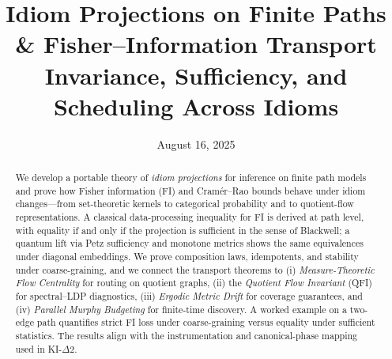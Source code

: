 \documentclass[11pt]{article}
\title{Idiom Projections on Finite Paths \& Fisher--Information Transport\\
\large Invariance, Sufficiency, and Scheduling Across Idioms}
\author{}
\date{August 16, 2025}
\theoremstyle{plain}
\theoremstyle{definition}
\theoremstyle{remark}
\newcommand{\1}{\mathbbm{1}}
\begin{document}
\maketitle

\begin{abstract}
We develop a portable theory of \emph{idiom projections} for inference on finite path models and prove how Fisher information (FI) and Cram{\'e}r--Rao bounds behave under idiom changes---from set-theoretic kernels to categorical probability and to quotient-flow representations. A classical data-processing inequality for FI is derived at path level, with equality if and only if the projection is sufficient in the sense of Blackwell; a quantum lift via Petz sufficiency and monotone metrics shows the same equivalences under diagonal embeddings. We prove composition laws, idempotents, and stability under coarse-graining, and we connect the transport theorems to (i) \emph{Measure-Theoretic Flow Centrality} for routing on quotient graphs, (ii) the \emph{Quotient Flow Invariant} (QFI) for spectral--LDP diagnostics, (iii) \emph{Ergodic Metric Drift} for coverage guarantees, and (iv) \emph{Parallel Murphy Budgeting} for finite-time discovery. A worked example on a two-edge path quantifies strict FI loss under coarse-graining versus equality under sufficient statistics. The results align with the instrumentation and canonical-phase mapping used in KI-\(\Delta\)2. \parencite{Blackwell1953,AmariNagaoka2000,Cencov1982,Petz1986,Petz1996,CoverThomas2006,elliott2025flow,elliott2025qfi,elliott2025drift,elliott2025pmb,elliott2025ki,elliott2025contracts,elliott2025graded}
\end{abstract}
\end{document}
